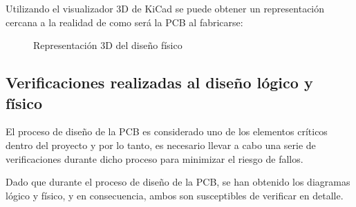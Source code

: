 Utilizando el visualizador 3D de KiCad se puede obtener un representación cercana a la realidad de como será la PCB al fabricarse:

\begin{figure}[htbp]
    \centering
    \caption{Representación 3D del diseño físico} \label{fig:lego}
    \end{figure}
\subsection{Verificaciones realizadas al diseño lógico y físico }

El proceso de diseño de la PCB es considerado uno de los elementos críticos dentro del proyecto y por lo tanto, es necesario llevar a cabo una serie de verificaciones durante dicho proceso para minimizar el riesgo de fallos.

Dado que durante el proceso de diseño de la PCB, se han obtenido los diagramas lógico y físico, y en consecuencia, ambos son susceptibles de verificar en detalle.

